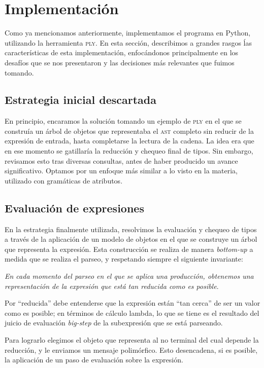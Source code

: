 \documentclass[11pt]{article}
\begin{document}
\section{Implementación}

Como ya mencionamos anteriormente, implementamos el programa en Python,
utilizando la herramienta \textsc{ply}. En esta sección, describimos a
grandes rasgos ĺas características de esta implementación, enfocándonos
principalmente en los desafíos que se nos presentaron y las decisiones más
relevantes que fuimos tomando.

\subsection{Estrategia inicial descartada}
En principio, encaramos la solución tomando un ejemplo de \textsc{ply} en el que se construía un árbol de objetos que representaba el \textsc{ast} completo sin reducir de la expresión de entrada, hasta completarse la lectura de la cadena. La idea era que en ese momento se gatillaría la reducción y chequeo final de tipos. Sin embargo, revisamos esto tras diversas consultas, antes de haber producido un avance significativo. Optamos por un enfoque más similar a lo visto en la materia, utilizado con gramáticas de atributos.

\subsection{Evaluación de expresiones}
\label{sec:reduccion}

En la estrategia finalmente utilizada, resolvimos la evaluación y chequeo de tipos a través de la aplicación de un modelo de objetos en el que se construye un árbol que representa la expresión. Esta construcción se realiza de manera \emph{bottom-up} a medida que se realiza el parseo, y respetando siempre el siguiente invariante:

\emph{En cada momento del parseo en el que se aplica una producción, obtenemos una representación de la expresión que está tan reducida como es posible}.

Por ``reducida'' debe entenderse que la expresión están ``tan cerca'' de ser un
valor como es posible; en términos de cálculo lambda, lo que se tiene es el
resultado del juicio de evaluación \emph{big-step} de la subexpresión que
se está parseando.

Para lograrlo elegimos el objeto que representa al no terminal del cual depende la reducción, y le enviamos un mensaje polimórfico. Esto desencadena, si es posible, la aplicación de un paso de evaluación sobre la expresión.
\end{document}
